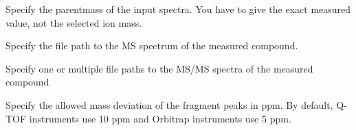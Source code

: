 \documentclass[letterpaper,10pt,openany,oneside]{sphinxmanual}
\begin{document}

\begin{fulllineitems}
\label{commandline:cmdoption-z}
Specify the parentmass of the input spectra. You have to give the exact measured value, not the selected ion mass.

\end{fulllineitems}


\begin{fulllineitems}
\label{commandline:cmdoption-1}
Specify the file path to the MS spectrum of the measured compound.

\end{fulllineitems}


\begin{fulllineitems}
\label{commandline:cmdoption-2}
Specify one or multiple file paths to the MS/MS spectra of the measured compound

\end{fulllineitems}


\begin{fulllineitems}
\label{commandline:cmdoption--ppm-max}
Specify the allowed mass deviation of the fragment peaks in ppm. By default, Q-TOF instruments use 10 ppm and Orbitrap instruments use 5 ppm.

\end{fulllineitems}
\end{document}
